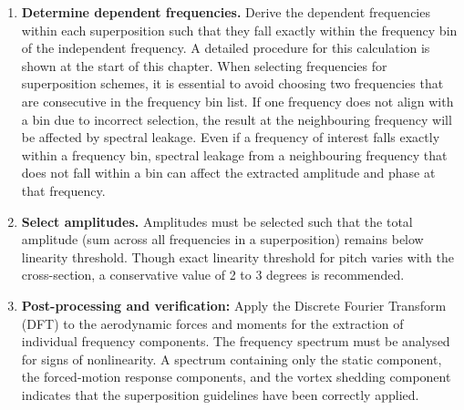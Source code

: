 \documentclass[../main]{subfiles}
\begin{document}
\begin{enumerate}
    \item \textbf{Determine dependent frequencies.} Derive the dependent frequencies within each superposition such that they fall exactly within 
          the frequency bin of the independent frequency.
          A detailed procedure for this calculation is shown at 
          the start of this chapter.
          When selecting frequencies for superposition schemes, it is essential 
          to avoid choosing two frequencies that are consecutive in the frequency bin list.
          If one frequency does not align with a bin due to incorrect selection, the result at the neighbouring frequency will be affected by spectral leakage.
          Even if a frequency of interest falls exactly within a 
          frequency bin, spectral leakage from a neighbouring frequency that does not fall within a bin can 
          affect the extracted amplitude and phase at that frequency.

    \item \textbf{Select amplitudes.} Amplitudes must be selected such that the total amplitude (sum across all frequencies in a superposition) 
          remains below linearity threshold. Though exact linearity threshold for pitch varies with the cross-section, a conservative value of 2 to 3 degrees is recommended.

    \item \textbf{Post-processing and verification:} Apply the Discrete Fourier Transform (DFT) to the 
          aerodynamic forces and moments for the extraction of individual frequency components.
          The frequency spectrum must be analysed for signs of nonlinearity. 
          A spectrum containing only the static 
          component, the forced-motion response components, and the vortex shedding component indicates that the 
          superposition guidelines have been correctly applied.
\end{enumerate}

\vspace{0.5em}
\end{document}
